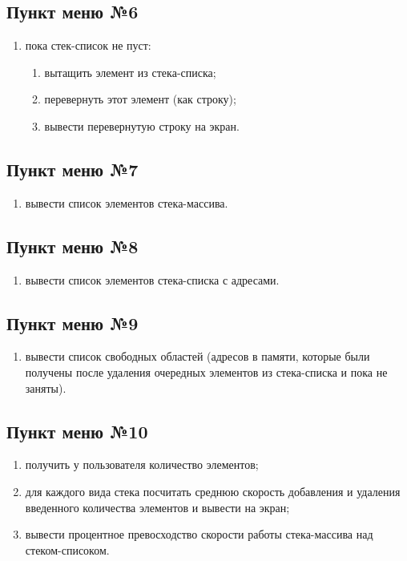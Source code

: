 \documentclass[a4paper,12pt]{extarticle}
\begin{document}
\subsection{Пункт меню №6}
\begin{enumerate}
    \item пока стек-список не пуст:
    \begin{enumerate}
    	\item вытащить элемент из стека-списка;
    	\item перевернуть этот элемент (как строку);
    	\item вывести перевернутую строку на экран.
    \end{enumerate}
\end{enumerate}

\subsection{Пункт меню №7}
\begin{enumerate}
    \item вывести список элементов стека-массива.
\end{enumerate}

\subsection{Пункт меню №8}
\begin{enumerate}
    \item вывести список элементов стека-списка с адресами.
\end{enumerate}

\subsection{Пункт меню №9}
\begin{enumerate}
    \item вывести список свободных областей (адресов в памяти, которые были получены после удаления очередных элементов из стека-списка и пока не заняты).
\end{enumerate}

\subsection{Пункт меню №10}
\begin{enumerate}
    \item получить у пользователя количество элементов;
    \item для каждого вида стека посчитать среднюю скорость добавления и удаления введенного количества элементов и вывести на экран;
    \item вывести процентное превосходство скорости работы стека-массива над стеком-списоком.
\end{enumerate}
\end{document}
